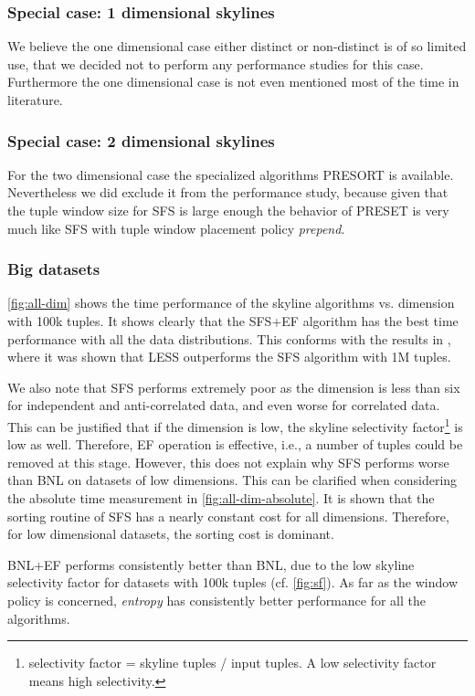 \subsubsection{Special case: 1 dimensional skylines}
We believe the one dimensional case either distinct or non-distinct is
of so limited use, that we decided not to perform any performance
studies for this case. Furthermore the one dimensional case is not
even mentioned most of the time in literature.

\subsubsection{Special case: 2 dimensional skylines}
For the two dimensional case the specialized algorithms PRESORT is
available.  Nevertheless we did exclude it from the performance
study, because given that the tuple window size for SFS is large enough
the behavior of PRESET is very much like SFS with tuple window placement
policy \emph{prepend}.

\subsubsection{Big datasets}
\label{sec:big-datasets}
\autoref{fig:all-dim} shows the time performance of the skyline
algorithms vs. dimension with 100k tuples. It shows clearly that the
SFS+EF algorithm has the best time performance with all the data
distributions.  This conforms with the results in \citep{Godfrey2007},
where it was shown that LESS outperforms the SFS algorithm with 1M
tuples.

We also note that SFS performs extremely poor as the dimension is less
than six for independent and anti-correlated data, and even worse for
correlated data.  This can be justified that if the dimension is low,
the skyline selectivity factor\footnote{selectivity factor = skyline
tuples / input tuples. A low selectivity factor means high
selectivity.}  is low as well. Therefore, EF operation is effective,
i.e., a number of tuples could be removed at this stage. However, this
does not explain why SFS performs worse than BNL on datasets of low
dimensions. This can be clarified when considering the absolute time
measurement in \autoref{fig:all-dim-absolute}.  It is shown that
the sorting routine of SFS has a nearly constant cost for all
dimensions. Therefore, for low dimensional datasets, the sorting cost
is dominant.

BNL+EF performs consistently better than BNL, due to the low skyline
selectivity factor for datasets with 100k tuples
(cf. \autoref{fig:sf}).  As far as the window policy is concerned,
\emph{entropy} has consistently better performance for all the
algorithms.

